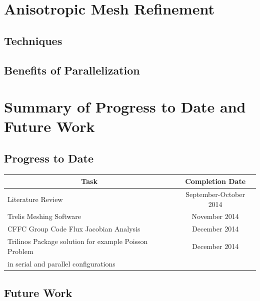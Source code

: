 \documentclass[titlepage,11pt,letterpaper]{article}
\begin{document}
\section{Anisotropic Mesh Refinement}
\subsection{Techniques}
\subsection{Benefits of Parallelization}



\newpage
\section{Summary of Progress to Date and Future Work}

\subsection{Progress to Date}

\begin{tabular}{|l|c|} \hline
\multicolumn{1}{|c|}{\bf{Task}} & \multicolumn{1}{|c|}{\bf{Completion Date}} \\

\hline Literature Review & September-October 2014 \\

\hline Trelis Meshing Software & November 2014 \\

\hline CFFC Group Code Flux Jacobian Analysis & December 2014 \\

\hline Trilinos Package solution for example Poisson Problem & December 2014 \\in serial and parallel configurations & \\

\hline
\end{tabular}

\subsection{Future Work}
\end{document}
